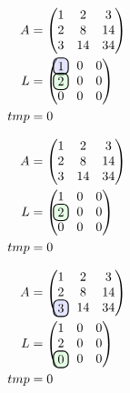 \documentclass[aspectratio=169,hyperref={pdfpagelabels=false}]{beamer}
\begin{document}
\begin{frame}
    \begin{align*}
        A &= \begin{pmatrix}
            1 &  2 & 3\\
            2 &  8 & 14\\
            3 & 14 & 34
        \end{pmatrix}\\
        L &= \begin{pmatrix}
            \hlight{1} & 0 & 0\\
            \tocalculate{2} & 0 & 0\\
            0 & 0 & 0
        \end{pmatrix}\\
        tmp &= 0
    \end{align*}
\end{frame}

\begin{frame}
    \begin{align*}
        A &= \begin{pmatrix}
            1 &  2 & 3\\
            2 &  8 & 14\\
            3 & 14 & 34
        \end{pmatrix}\\
        L &= \begin{pmatrix}
            1 & 0 & 0\\
            \tocalculate{2} & 0 & 0\\
            0 & 0 & 0
        \end{pmatrix}\\
        tmp &= 0
    \end{align*}
\end{frame}
\begin{frame}
    \begin{align*}
        A &= \begin{pmatrix}
            1 &  2 & 3\\
            2 &  8 & 14\\
            \hlight{3} & 14 & 34
        \end{pmatrix}\\
        L &= \begin{pmatrix}
            1 & 0 & 0\\
            2 & 0 & 0\\
            \tocalculate{0} & 0 & 0
        \end{pmatrix}\\
        tmp &= 0
    \end{align*}
\end{frame}
\end{document}
